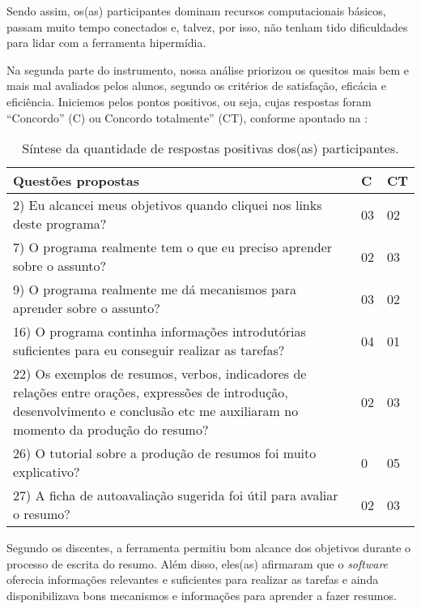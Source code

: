\documentclass[portuguese]{textolivre}
\begin{document}
Sendo assim, os(as) participantes dominam recursos computacionais básicos, passam muito tempo conectados e, talvez, por isso, não tenham tido dificuldades para lidar com a ferramenta hipermídia.

Na segunda parte do instrumento, nossa análise priorizou os quesitos mais bem e mais mal avaliados pelos alunos, segundo os critérios de satisfação, eficácia e eficiência. Iniciemos pelos pontos positivos, ou seja, cujas respostas foram “Concordo” (C) ou Concordo totalmente” (CT), conforme apontado na :

\begin{table}[htbp]
\begin{threeparttable}
\caption{Síntese da quantidade de respostas positivas dos(as) participantes.}
\label{tbl2}
\centering
\begin{tabular}{p{8cm} p{1.5cm} p{1.5cm}}
\toprule
Questões propostas & C & CT \\ 
 \midrule
2) Eu alcancei meus objetivos quando cliquei nos links deste programa? & 03 & 02 \\
7) O programa realmente tem o que eu preciso aprender sobre o assunto? & 02 & 03 \\
9) O programa realmente me dá mecanismos para aprender sobre o assunto? & 03 & 02 \\
16) O programa continha informações introdutórias suficientes para eu conseguir realizar as tarefas? & 04 & 01 \\
22) Os exemplos de resumos, verbos, indicadores de relações entre orações, expressões de introdução, desenvolvimento e conclusão etc me auxiliaram no momento da produção do resumo? & 02 & 03 \\
26) O tutorial sobre a produção de resumos foi muito explicativo? & 0 & 05 \\
27) A ficha de autoavaliação sugerida foi útil para avaliar o resumo? & 02 & 03 \\
\bottomrule
\end{tabular}
\end{threeparttable}
\end{table}

Segundo os discentes, a ferramenta permitiu bom alcance dos objetivos durante o processo de escrita do resumo. Além disso, eles(as) afirmaram que o \textit{software} oferecia informações relevantes e suficientes para realizar as tarefas e ainda disponibilizava bons mecanismos e informações para aprender a fazer resumos.
\end{document}
